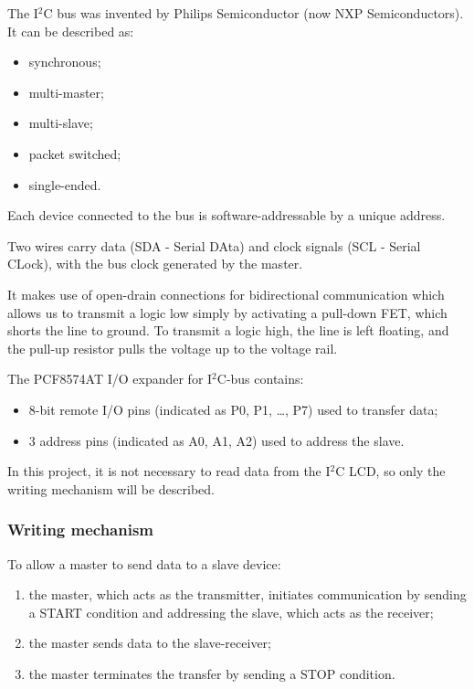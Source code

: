 \documentclass[a4paper, 12pt]{article}
\begin{document}
The I$^2$C bus was invented by Philips Semiconductor (now NXP Semiconductors). It can be described as:
\begin{itemize}
    \item synchronous;
    \item multi-master;
    \item multi-slave;
    \item packet switched;
    \item single-ended.
\end{itemize}

Each device connected to the bus is software-addressable by a unique address.

Two wires carry data (SDA - Serial DAta) and clock signals (SCL - Serial CLock), with the bus clock generated by the master.

It makes use of open-drain connections for bidirectional communication which allows us to transmit a logic low simply by activating a pull-down FET, which shorts the line to ground.
To transmit a logic high, the line is left floating, and the pull-up resistor pulls the voltage up to the voltage rail.

The PCF8574AT I/O expander for I$^2$C-bus contains:
\begin{itemize}
    \item 8-bit remote I/O pins (indicated as P0, P1, \dots, P7) used to transfer data;
    \item 3 address pins (indicated as A0, A1, A2) used to address the slave.
\end{itemize}

In this project, it is not necessary to read data from the I$^2$C LCD, so only the writing mechanism will be described.

\subsubsection{Writing mechanism}

To allow a master to send data to a slave device:
\begin{enumerate}
    \item the master, which acts as the transmitter, initiates communication by sending a START condition and addressing the slave, which acts as the receiver;
    \item the master sends data to the slave-receiver;
    \item the master terminates the transfer by sending a STOP condition.
\end{enumerate}
\end{document}

